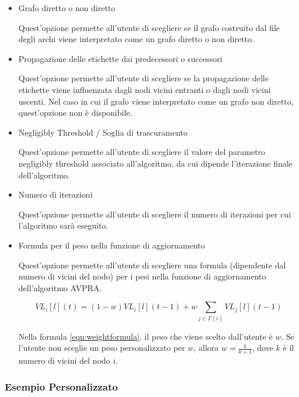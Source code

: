 \documentclass[a4paper,12pt]{report}
\begin{document}
			\begin{itemize}
				\item Grafo diretto o non diretto 

				Quest'opzione permette all'utente di scegliere se il grafo costruito dal file degli archi viene interpretato come un grafo diretto o non diretto.

				\item Propagazione delle etichette dai predecessori o successori 

				Quest'opzione permette all'utente di scegliere se la propagazione delle etichette viene influenzata dagli nodi vicini entranti o dagli nodi vicini uscenti. Nel caso in cui il grafo viene interpretato come un grafo non diretto, quest'opzione non è disponibile.

				\item Negligibly Threshold / Soglia di trascuramento

				Quest'opzione permette all'utente di scegliere il valore del parametro negligibly threshold associato all'algoritmo, da cui dipende l'iterazione finale dell'algoritmo.

				\item Numero di iterazioni 

				Quest'opzione permette all'utente di scegliere il numero di iterazioni per cui l'algoritmo sarà eseguito.

				\item Formula per il peso nella funzione di aggiornamento 

				Quest'opzione permette all'utente di scegliere una formula (dipendente dal numero di vicini del nodo) per i pesi nella funzione di aggiornamento dell'algoritmo AVPRA.


				\begin{equation}
				\label{eqn:weightformula}
				VL_i [l] (t) = (1-w) VL_i [l] (t-1) + w \sum_{j \in \Gamma(i)} VL_j [l](t-1)
				\end{equation}

				Nella formula \ref{eqn:weightformula}, il peso che viene scelto dall'utente è $w$. Se l'utente non sceglie un peso personalizzato per $w$, allora $w=\frac{1}{k+1}$, dove $k$ è il numero di vicini del nodo $i$.

			\end{itemize}
			
			\subsubsection{Esempio Personalizzato}
\end{document}
